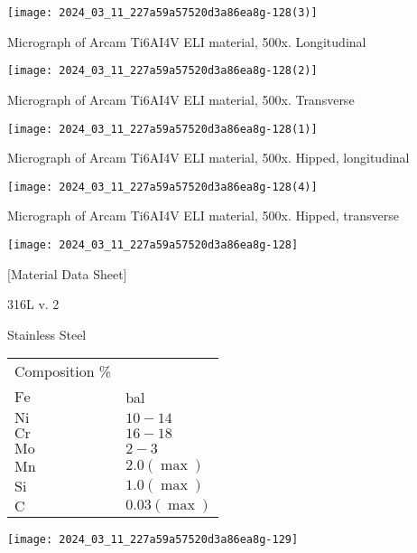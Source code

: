 \documentclass[10pt]{article}
\begin{document}
\begin{center}
\texttt{[image: 2024\_03\_11\_227a59a57520d3a86ea8g-128(3)]}
\end{center}

Micrograph of Arcam Ti6AI4V ELI material, 500x. Longitudinal

\begin{center}
\texttt{[image: 2024\_03\_11\_227a59a57520d3a86ea8g-128(2)]}
\end{center}

Micrograph of Arcam Ti6AI4V ELI material, 500x. Transverse

\begin{center}
\texttt{[image: 2024\_03\_11\_227a59a57520d3a86ea8g-128(1)]}
\end{center}

Micrograph of Arcam Ti6AI4V ELI material, 500x. Hipped, longitudinal

\begin{center}
\texttt{[image: 2024\_03\_11\_227a59a57520d3a86ea8g-128(4)]}
\end{center}

Micrograph of Arcam Ti6AI4V ELI material, 500x. Hipped, transverse

\begin{center}
\texttt{[image: 2024\_03\_11\_227a59a57520d3a86ea8g-128]}
\end{center}

[Material Data Sheet]

316L v. 2

Stainless Steel

\begin{center}
\begin{tabular}{ll}
\hline
Composition \% &  \\
$\mathrm{Fe}$ & bal \\
\hline
$\mathrm{Ni}$ & $10-14$ \\
\hline
$\mathrm{Cr}$ & $16-18$ \\
\hline
$\mathrm{Mo}$ & $2-3$ \\
\hline
$\mathrm{Mn}$ & $2.0(\max )$ \\
\hline
$\mathrm{Si}$ & $1.0(\max )$ \\
\hline
$\mathrm{C}$ & $0.03(\max )$ \\
\hline
\end{tabular}
\end{center}

\begin{center}
\texttt{[image: 2024\_03\_11\_227a59a57520d3a86ea8g-129]}
\end{center}
\end{document}
